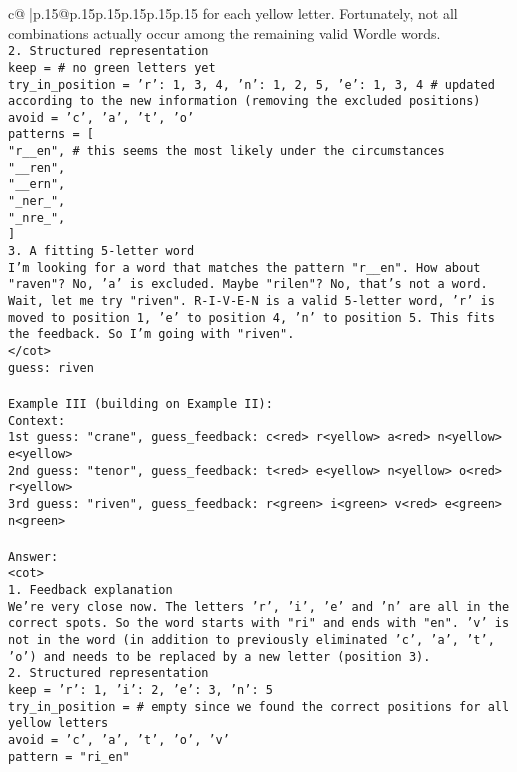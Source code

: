 \documentclass{article}
\begin{document}
{\begin{supertabular}{c@{$\;$}|p{.15\linewidth}@{}p{.15\linewidth}p{.15\linewidth}p{.15\linewidth}p{.15\linewidth}p{.15\linewidth}}
{{{for each yellow letter. Fortunately, not all combinations actually occur among the remaining valid Wordle words.\\ \tt 2. Structured representation\\ \tt keep = {}  # no green letters yet\\ \tt try_in_position = {'r': {1, 3, 4}, 'n': {1, 2, 5}, 'e': {1, 3, 4}}  # updated according to the new information (removing the excluded positions)\\ \tt avoid = {'c', 'a', 't', 'o'}\\ \tt patterns = [\\ \tt     "r__en",  # this seems the most likely under the circumstances\\ \tt     "__ren",\\ \tt     "__ern",\\ \tt     "_ner_",\\ \tt     "_nre_",\\ \tt ]\\ \tt 3. A fitting 5-letter word\\ \tt I'm looking for a word that matches the pattern "r__en". How about "raven"? No, 'a' is excluded. Maybe "rilen"? No, that's not a word. Wait, let me try "riven". R-I-V-E-N is a valid 5-letter word, 'r' is moved to position 1, 'e' to position 4, 'n' to position 5. This fits the feedback. So I'm going with "riven".\\ \tt </cot>\\ \tt guess: riven\\ \tt \\ \tt Example III (building on Example II):\\ \tt Context:\\ \tt 1st guess: "crane", guess_feedback: c<red> r<yellow> a<red> n<yellow> e<yellow>\\ \tt 2nd guess: "tenor", guess_feedback: t<red> e<yellow> n<yellow> o<red> r<yellow>\\ \tt 3rd guess: "riven", guess_feedback: r<green> i<green> v<red> e<green> n<green>\\ \tt \\ \tt Answer:\\ \tt <cot>\\ \tt 1. Feedback explanation\\ \tt We're very close now. The letters 'r', 'i', 'e' and 'n' are all in the correct spots. So the word starts with "ri" and ends with "en". 'v' is not in the word (in addition to previously eliminated 'c', 'a', 't', 'o') and needs to be replaced by a new letter (position 3).\\ \tt 2. Structured representation\\ \tt keep = {'r': 1, 'i': 2, 'e': 3, 'n': 5}\\ \tt try_in_position = {}  # empty since we found the correct positions for all yellow letters\\ \tt avoid = {'c', 'a', 't', 'o', 'v'}\\ \tt pattern = "ri_en"\\ \tt }}}
\end{supertabular}}
\end{document}

